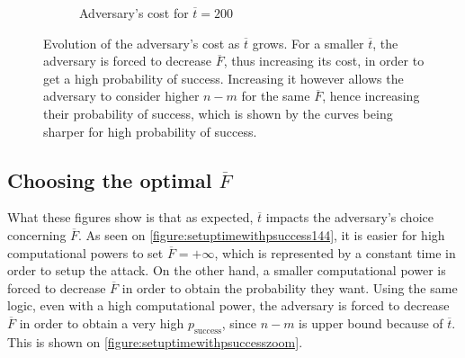 \begin{figure}[ht]
\begin{subfigure}[b]{0.45\textwidth}
\begin{tikzpicture}
        \end{tikzpicture}
        \caption{Adversary's cost for \(\overline{t}=200\)}
        \label{figure:setuptimewithpsuccess288}
    \end{subfigure}
    \caption{Evolution of the adversary's cost as \(\overline{t}\) grows. For a smaller \(\overline{t}\), the adversary is forced to decrease \(\overline{F}\), thus increasing its cost, in order to get a high probability of success. Increasing it however allows the adversary to consider higher \(n-m\) for the same \(\overline{F}\), hence increasing their probability of success, which is shown by the curves being sharper for high probability of success.}
    \label{figure:setuptimewithpsuccess}
\end{figure}

\subsection{Choosing the optimal \(\overline{F}\)}

What these figures show is that as expected, \(\overline{t}\) impacts the adversary's choice concerning \(\overline{F}\). As seen on \autoref{figure:setuptimewithpsuccess144}, it is easier for high computational powers to set \(\overline{F}=+\infty\), which is represented by a constant time in order to setup the attack. On the other hand, a smaller computational power is forced to decrease \(\overline{F}\) in order to obtain the probability they want. Using the same logic, even with a high computational power, the adversary is forced to decrease \(\overline{F}\) in order to obtain a very high \(p_{\text{success}}\), since \(n - m\) is upper bound because of \(\overline{t}\). This is shown on \autoref{figure:setuptimewithpsuccesszoom}.

